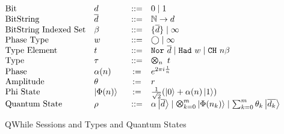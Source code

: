 \begin{figure}[t]
  \small
  \[\hspace*{-0.5em}
\begin{array}{l>{$} p{1.2cm} <{$} c l}
      \text{Bit} & d & ::= & 0 \mid 1 \\
      \text{BitString} & \overline{d} & ::= & \mathbb{N} \to d \\
      \text{BitString Indexed Set} & \beta & ::= & \{\overline{d} \} \mid \infty \\
      \text{Phase Type} & w & ::= & \bigcirc \mid \infty \\
      \text{Type Element} & t & ::= & \tnor{\overline{d}} \mid \thad{w} \mid \tch{n}{\beta}\\
      \text{Type} & \tau & ::= & \ttype{n}{t}\\
      \text{Phase} & \alpha(n) & := & e^{2\pi i \frac{1}{n}} \\
      \text{Amplitude} & \theta & := & r \\
      \text{Phi State} & \qket{n} & := & \frac{1}{\sqrt{2}} (\ket{0}+\alpha(n)\ket{1}) \\
      \text{Quantum State} & \rho & ::= & \alpha\ket{\overline{d}}\mid \Motimes_{k=0}^{m}\ket{\Phi(n_k)}
                                         \mid \sum_{k=0}^{m}\theta_k\ket{\overline{d_k}}
    \end{array}
  \]
  \caption{QWhile Sessions and Types and Quantum States}
  \label{fig:vqir-state}
\end{figure}


